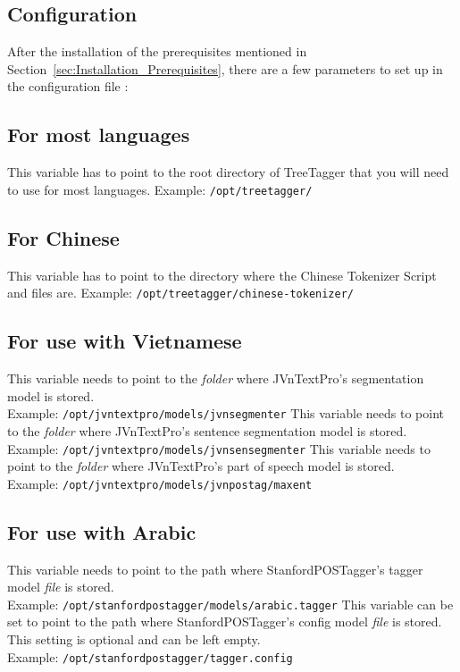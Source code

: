 \subsection{Configuration}\label{sec:Installation_Configuration}
After the installation of the prerequisites mentioned in Section~\ref{sec:Installation_Prerequisites}, there are a few parameters to set up in the configuration file \configFile{}:
\begin{itemize}

\subsection*{\textbf{For most languages}}
This variable has to point to the root directory of TreeTagger that you will need to use for most languages.
Example: \texttt{/opt/treetagger/}

\subsection*{\textbf{For Chinese}}
This variable has to point to the directory where the Chinese Tokenizer Script and files are.
Example: \texttt{/opt/treetagger/chinese-tokenizer/}

\subsection*{\textbf{For use with Vietnamese}}
This variable needs to point to the \textit{folder} where JVnTextPro's segmentation model is stored. \\
Example: \texttt{/opt/jvntextpro/models/jvnsegmenter}
This variable needs to point to the \textit{folder} where JVnTextPro's sentence segmentation model is stored. \\
Example: \texttt{/opt/jvntextpro/models/jvnsensegmenter}
This variable needs to point to the \textit{folder} where JVnTextPro's part of speech model is stored. \\
Example: \texttt{/opt/jvntextpro/models/jvnpostag/maxent}

\subsection*{\textbf{For use with Arabic}}
This variable needs to point to the path where StanfordPOSTagger's tagger model \textit{file} is stored. \\
Example: \texttt{/opt/stanfordpostagger/models/arabic.tagger}
This variable can be set to point to the path where StanfordPOSTagger's config model \textit{file} is stored. This setting is optional and can be left empty. \\
Example: \texttt{/opt/stanfordpostagger/tagger.config}


\end{itemize}
